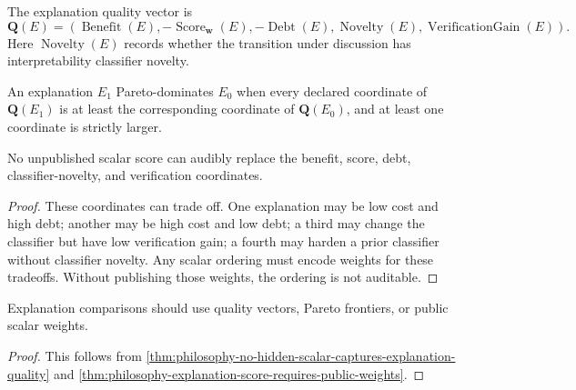 \begin{definition}
\label{def:philosophy-explanation-quality-vector}
The explanation quality vector is
$$
\mathbf Q(E)
=
(
\operatorname{Benefit}(E),
-
\operatorname{Score}_{\mathbf w}(E),
-
\operatorname{Debt}(E),
\operatorname{Novelty}(E),
\operatorname{VerificationGain}(E)
).
$$
Here $\operatorname{Novelty}(E)$ records whether the transition under
discussion has interpretability classifier novelty.
\end{definition}

\begin{definition}
\label{def:philosophy-explanation-pareto-comparison}
An explanation $E_1$ Pareto-dominates $E_0$ when every declared
coordinate of $\mathbf Q(E_1)$ is at least the corresponding coordinate
of $\mathbf Q(E_0)$, and at least one coordinate is strictly larger.
\end{definition}

\begin{theorem}
\label{thm:philosophy-no-hidden-scalar-captures-explanation-quality}
No unpublished scalar score can audibly replace the benefit, score,
debt, classifier-novelty, and verification coordinates.
\end{theorem}
\begin{proof}
These coordinates can trade off. One explanation may be low cost and
high debt; another may be high cost and low debt; a third may change the
classifier but have low verification gain; a fourth may harden a prior
classifier without classifier novelty. Any scalar ordering must encode
weights for these tradeoffs. Without publishing those weights, the
ordering is not auditable.
\end{proof}

\begin{corollary}
\label{cor:philosophy-explanation-comparison-vectors-or-public-weights}
Explanation comparisons should use quality vectors, Pareto frontiers, or
public scalar weights.
\end{corollary}
\begin{proof}
This follows from
\autoref{thm:philosophy-no-hidden-scalar-captures-explanation-quality}
and \autoref{thm:philosophy-explanation-score-requires-public-weights}.
\end{proof}

